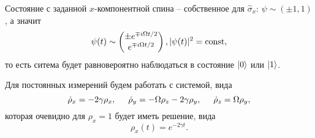 
Состояние с заданной $x$-компонентной спина -- собственное для $\hat{\sigma}_x$: $\psi \sim (\pm 1, 1)$, а значит 
\begin{equation*}
	\psi(t) \sim \begin{pmatrix}
		\pm e^{\mp i \Omega t/2} \\ e^{\mp i \Omega t/2}
	\end{pmatrix},
	|\psi(t)|^2 = \textnormal{const},
\end{equation*}
то есть ситема будет равновероятно наблюдаться в состояние $\left| 0 \right\rangle$ или $\left| 1 \right\rangle$. 

Для постоянных измерений будем работать с системой, вида
\begin{equation*}
	\dot{\rho}_x = - 2 \gamma \rho_x,
	\hspace{5 mm} 
	\dot{\rho}_y = -\Omega \rho_z - 2 \gamma \rho_y,
	\hspace{5 mm} 
	\dot{\rho}_z = \Omega \rho_y,
\end{equation*}
которая очевидно для $\rho_x = 1$ будет иметь решение, вида
\begin{equation*}
	\rho_x (t) = e^{-2\gamma t}.
\end{equation*}